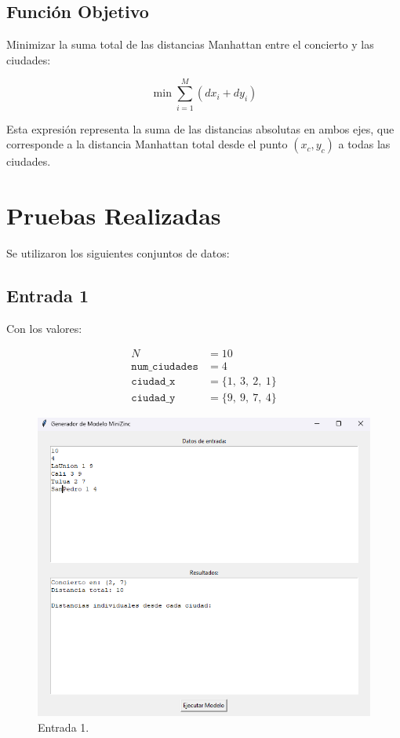 \documentclass[conference]{IEEEtran}
\begin{document}
\subsection*{Función Objetivo}

Minimizar la suma total de las distancias Manhattan entre el concierto y las ciudades:

\[
\min \sum_{i=1}^{M} (dx_i + dy_i)
\]

Esta expresión representa la suma de las distancias absolutas en ambos ejes, que corresponde a la distancia Manhattan total desde el punto $(x_c, y_c)$ a todas las ciudades.


\section{Pruebas Realizadas}
Se utilizaron los siguientes conjuntos de datos:

\subsection{Entrada 1}

Con los valores:

\begin{align*}
	N &= 10 \\
	\texttt{num\_ciudades} &= 4 \\
	\texttt{ciudad\_x} &= \{1,\ 3,\ 2,\ 1\} \\
	\texttt{ciudad\_y} &= \{9,\ 9,\ 7,\ 4\}
\end{align*}

\begin{figure}[h]
	\centering
	\includegraphics[width=1.0\linewidth]{images/entrada1}
	\caption{Entrada 1.}
	\label{fig:entrada1}
\end{figure}
\end{document}
